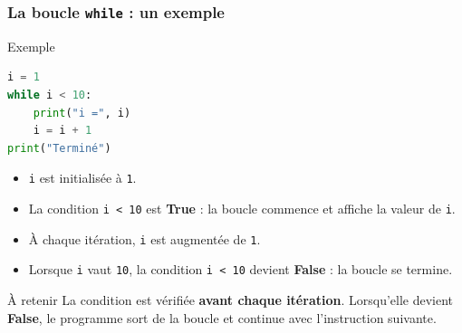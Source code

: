\documentclass[10pt]{beamer}
\begin{document}
\begin{frame}[containsverbatim]
	\frametitle{La boucle \texttt{while} : un exemple}
	
	\begin{exampleblock}{Exemple}
		\begin{lstlisting}[language=Python]
i = 1
while i < 10:
	print("i =", i)
	i = i + 1
print("Terminé")
		\end{lstlisting}
	\end{exampleblock}
	
	\vspace{0.1cm}
	
	\begin{itemize}
		\item \texttt{i} est initialisée à \texttt{1}.
		
		\item La condition \texttt{i < 10} est \textbf{True} :
		la boucle commence et affiche la valeur de \texttt{i}.
		
		\item À chaque itération, \texttt{i} est augmentée de \texttt{1}.
		
		\item Lorsque \texttt{i} vaut \texttt{10}, la condition
		\texttt{i < 10} devient \textbf{False} : la boucle se termine.
	\end{itemize}
	
	\vspace{0.05cm}
	
	\begin{alertblock}{À retenir}
		La condition est vérifiée \textbf{avant chaque itération}.
		Lorsqu'elle devient \textbf{False}, le programme sort de la boucle
		et continue avec l'instruction suivante.
	\end{alertblock}
	
\end{frame}
\end{document}
